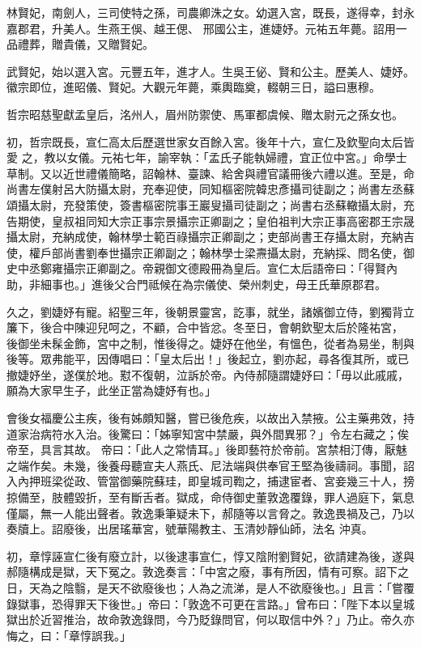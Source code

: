 \begin{pinyinscope}
 林賢妃，南劍人，三司使特之孫，司農卿洙之女。幼選入宮，既長，遂得幸，封永嘉郡君，升美人。生燕王俁、越王偲、
 邢國公主，進婕妤。元祐五年薨。詔用一品禮葬，贈貴儀，又贈賢妃。



 武賢妃，始以選入宮。元豐五年，進才人。生吳王佖、賢和公主。歷美人、婕妤。徽宗即位，進昭儀、賢妃。大觀元年薨，乘輿臨奠，輟朝三日，謚曰惠穆。



 哲宗昭慈聖獻孟皇后，洺州人，眉州防禦使、馬軍都虞候、贈太尉元之孫女也。



 初，哲宗既長，宣仁高太后歷選世家女百餘入宮。後年十六，宣仁及欽聖向太后皆愛
 之，教以女儀。元祐七年，諭宰執：「孟氏子能執婦禮，宜正位中宮。」命學士草制。又以近世禮儀簡略，詔翰林、臺諫、給舍與禮官議冊後六禮以進。至是，命尚書左僕射呂大防攝太尉，充奉迎使，同知樞密院韓忠彥攝司徒副之；尚書左丞蘇頌攝太尉，充發策使，簽書樞密院事王巖叟攝司徒副之；尚書右丞蘇轍攝太尉，充告期使，皇叔祖同知大宗正事宗景攝宗正卿副之；皇伯祖判大宗正事高密郡王宗晟攝太尉，充納成使，翰林學士範百祿攝宗正卿副之；吏部尚書王存攝太尉，充納吉使，權戶部尚書劉奉世攝宗正卿副之；翰林學士梁燾攝太尉，充納採、問名使，御史中丞鄭雍攝宗正卿副之。帝親御文德殿冊為皇后。宣仁太后語帝曰：「得賢內助，非細事也。」進後父合門祗候在為宗儀使、榮州刺史，母王氏華原郡君。



 久之，劉婕妤有寵。紹聖三年，後朝景靈宮，訖事，就坐，諸嬪御立侍，劉獨背立簾下，後合中陳迎兒呵之，不顧，合中皆忿。冬至日，會朝欽聖太后於隆祐宮，
 後御坐未髹金飾，宮中之制，惟後得之。婕妤在他坐，有慍色，從者為易坐，制與後等。眾弗能平，因傳唱曰：「皇太后出！」後起立，劉亦起，尋各復其所，或已撤婕妤坐，遂僕於地。懟不復朝，泣訴於帝。內侍郝隨謂婕妤曰：「毋以此戚戚，願為大家早生子，此坐正當為婕妤有也。」



 會後女福慶公主疾，後有姊頗知醫，嘗已後危疾，以故出入禁掖。公主藥弗效，持道家治病符水入治。後驚曰：「姊寧知宮中禁嚴，與外間異邪？」令左右藏之；俟帝至，具言其故。
 帝曰：「此人之常情耳。」後即藝符於帝前。宮禁相汀傳，厭魅之端作矣。未幾，後養母聽宣夫人燕氏、尼法端與供奉官王堅為後禱祠。事聞，詔入內押班梁從政、管當御藥院蘇珪，即皇城司鞫之，捕逮宦者、宮妾幾三十人，搒掠備至，肢體毀折，至有斷舌者。獄成，命侍御史董敦逸覆錄，罪人過庭下，氣息僅屬，無一人能出聲者。敦逸秉筆疑未下，郝隨等以言脅之。敦逸畏禍及己，乃以奏牘上。詔廢後，出居瑤華宮，號華陽教主、玉清妙靜仙師，法名
 沖真。



 初，章惇誣宣仁後有廢立計，以後逮事宣仁，惇又陰附劉賢妃，欲請建為後，遂與郝隨構成是獄，天下冤之。敦逸奏言：「中宮之廢，事有所因，情有可察。詔下之日，天為之陰翳，是天不欲廢後也；人為之流涕，是人不欲廢後也。」且言：「嘗覆錄獄事，恐得罪天下後世。」帝曰：「敦逸不可更在言路。」曾布曰：「陛下本以皇城獄出於近習推治，故命敦逸錄問，今乃貶錄問官，何以取信中外？」乃止。帝久亦悔之，曰：「章惇誤我。」




\end{pinyinscope}
